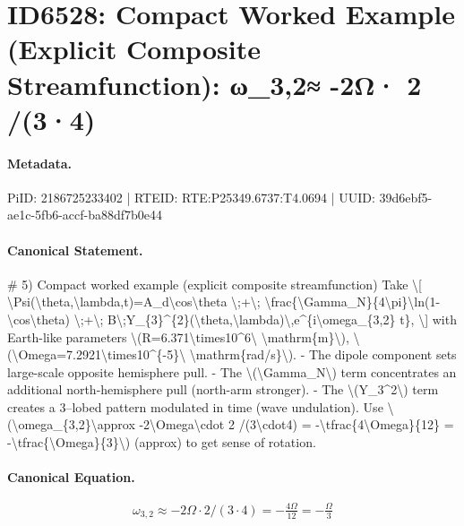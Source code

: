 \section*{ID6528: Compact Worked Example (Explicit Composite Streamfunction): ω\_3,2≈ -2Ω· 2 /(3·4)}
\paragraph{Metadata.}
PiID: 2186725233402 | RTEID: RTE:P25349.6737:T4.0694 | UUID: 39d6ebf5-ae1c-5fb6-accf-ba88df7b0e44

\paragraph{Canonical Statement.}
\# 5) Compact worked example (explicit composite streamfunction) Take \textbackslash{}[ \textbackslash{}Psi(\textbackslash{}theta,\textbackslash{}lambda,t)=A\_d\textbackslash{}cos\textbackslash{}theta \textbackslash{};+\textbackslash{}; \textbackslash{}frac\{\textbackslash{}Gamma\_N\}\{4\textbackslash{}pi\}\textbackslash{}ln(1-\textbackslash{}cos\textbackslash{}theta) \textbackslash{};+\textbackslash{}; B\textbackslash{};Y\_\{3\}\textasciicircum{}\{2\}(\textbackslash{}theta,\textbackslash{}lambda)\textbackslash{},e\textasciicircum{}\{i\textbackslash{}omega\_\{3,2\} t\}, \textbackslash{}] with Earth-like parameters \textbackslash{}(R=6.371\textbackslash{}times10\textasciicircum{}6\textbackslash{} \textbackslash{}mathrm\{m\}\textbackslash{}), \textbackslash{}(\textbackslash{}Omega=7.2921\textbackslash{}times10\textasciicircum{}\{-5\}\textbackslash{} \textbackslash{}mathrm\{rad/s\}\textbackslash{}). - The dipole component sets large-scale opposite hemisphere pull. - The \textbackslash{}(\textbackslash{}Gamma\_N\textbackslash{}) term concentrates an additional north-hemisphere pull (north-arm stronger). - The \textbackslash{}(Y\_3\textasciicircum{}2\textbackslash{}) term creates a 3–lobed pattern modulated in time (wave undulation). Use \textbackslash{}(\textbackslash{}omega\_\{3,2\}\textbackslash{}approx -2\textbackslash{}Omega\textbackslash{}cdot 2 /(3\textbackslash{}cdot4) = -\textbackslash{}tfrac\{4\textbackslash{}Omega\}\{12\} = -\textbackslash{}tfrac\{\textbackslash{}Omega\}\{3\}\textbackslash{}) (approx) to get sense of rotation.

\paragraph{Canonical Equation.}
\[
\omega_{3,2}\approx -2\Omega\cdot 2 /(3\cdot4) = -\tfrac{4\Omega}{12} = -\tfrac{\Omega}{3}
\]

